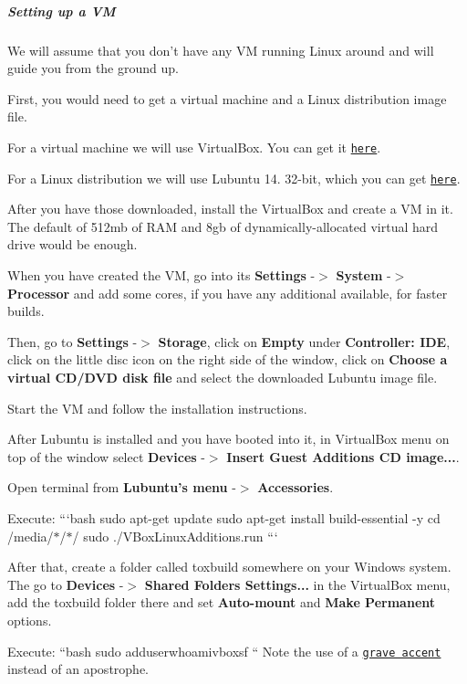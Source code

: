\label{_windows-cross-compile-vm}%
 \subparagraph*{Setting up a V\+M}

We will assume that you don't have any V\+M running Linux around and will guide you from the ground up.

First, you would need to get a virtual machine and a Linux distribution image file.

For a virtual machine we will use Virtual\+Box. You can get it \href{https://www.virtualbox.org/wiki/Downloads}{\tt here}.

For a Linux distribution we will use Lubuntu 14. 32-\/bit, which you can get \href{https://help.ubuntu.com/community/Lubuntu/GetLubuntu}{\tt here}.

After you have those downloaded, install the Virtual\+Box and create a V\+M in it. The default of 512mb of R\+A\+M and 8gb of dynamically-\/allocated virtual hard drive would be enough.

When you have created the V\+M, go into its {\bfseries Settings} -\/$>$ {\bfseries System} -\/$>$ {\bfseries Processor} and add some cores, if you have any additional available, for faster builds.

Then, go to {\bfseries Settings} -\/$>$ {\bfseries Storage}, click on {\bfseries Empty} under {\bfseries Controller\+: I\+D\+E}, click on the little disc icon on the right side of the window, click on {\bfseries Choose a virtual C\+D/\+D\+V\+D disk file} and select the downloaded Lubuntu image file.

Start the V\+M and follow the installation instructions.

After Lubuntu is installed and you have booted into it, in Virtual\+Box menu on top of the window select {\bfseries Devices} -\/$>$ {\bfseries Insert Guest Additions C\+D image...}.

Open terminal from {\bfseries Lubuntu's menu} -\/$>$ {\bfseries Accessories}.

Execute\+: ```bash sudo apt-\/get update sudo apt-\/get install build-\/essential -\/y cd /media/$\ast$/$\ast$/ sudo ./\+V\+Box\+Linux\+Additions.run ```

After that, create a folder called {\ttfamily toxbuild} somewhere on your Windows system. The go to {\bfseries Devices} -\/$>$ {\bfseries Shared Folders Settings...} in the Virtual\+Box menu, add the {\ttfamily toxbuild} folder there and set {\bfseries Auto-\/mount} and {\bfseries Make Permanent} options.

Execute\+: ``{\ttfamily bash sudo adduser}whoami{\ttfamily vboxsf }`` Note the use of a \href{http://en.wikipedia.org/wiki/Grave_accent}{\tt grave accent} instead of an apostrophe.

